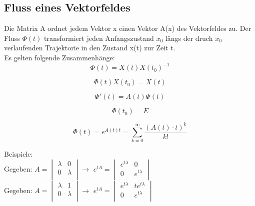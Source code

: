 \subsection{Fluss eines Vektorfeldes}
Die Matrix A ordnet jedem Vektor x einen Vektor A(x) des Vektorfeldes zu. Der Fluss $\Phi(t)$ transformiert jeden Anfangszustand $x_0$ längs der druch $x_0$ verlaufenden Trajektorie in den Zustand x(t) zur Zeit t. \\
Es gelten folgende Zusammenhänge:\\
\begin{equation*}
\Phi(t) = X(t)X(t_0)^{-1}
\end{equation*}

\begin{equation*}
\Phi(t)X(t_0) = X(t)
\end{equation*}

\begin{equation*}
\Phi'(t) = A(t)\Phi(t)
\end{equation*}

\begin{equation*}
\Phi(t_0) = E
\end{equation*}

\begin{equation*}
\Phi(t) = e^{A(t)t} =\sum_{k=0}^{\infty}\frac{(A(t)\cdot t)^k}{k!}
\end{equation*}

Beispiele:\\
Gegeben: $A = 	\begin{vmatrix} 
	        		\lambda & 0\\ 
	        		0 & \lambda\\   
				\end{vmatrix} 
				\rightarrow$ 
$e^{tA} = \begin{vmatrix} 
	        		e^{t\lambda} & 0\\ 
	        		0 & e^{t\lambda}\\   
				\end{vmatrix}$\\
Gegeben: $A = 	\begin{vmatrix} 
	        		\lambda & 1\\ 
	        		0 & \lambda\\   
				\end{vmatrix} 
				\rightarrow$ 
$e^{tA} = \begin{vmatrix} 
	        		e^{t\lambda} & te^{t\lambda}\\ 
	        		0 & e^{t\lambda}\\   
				\end{vmatrix}$\\
				

